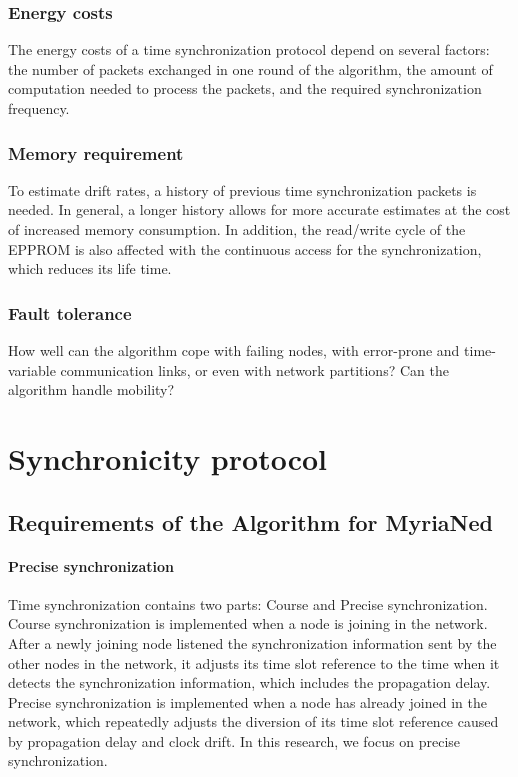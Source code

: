 \documentclass[a4paper,10pt]{report}
\begin{document}
\subsection{\textbf{Energy costs}}
The energy costs of a time synchronization protocol depend on several factors: the number of packets exchanged in one round of the algorithm, the amount of computation needed to process the packets, and the required synchronization frequency.
\subsection{\textbf{Memory requirement}}
To estimate drift rates, a history of previous time synchronization packets is needed. In general, a longer history allows for more accurate estimates at the cost of increased memory consumption. In addition, the read/write cycle of the EPPROM is also affected with the continuous access for the synchronization, which reduces its life time.
\subsection{\textbf{Fault tolerance}}
How well can the algorithm cope with failing nodes, with error-prone and time-variable communication links, or even with network partitions? Can the algorithm handle mobility?
\chapter{\textbf{Synchronicity protocol}}
\section{\textbf{Requirements of the Algorithm for MyriaNed}}
\subsubsection{\textbf{Precise synchronization}}
Time synchronization contains two parts: Course and Precise synchronization. Course synchronization is implemented when a node is joining in the network. After a newly joining node listened the synchronization information sent by the other nodes in the network, it adjusts its time slot reference to the time when it detects the synchronization information, which includes the propagation delay. Precise synchronization is implemented when a node has already joined in the network, which repeatedly adjusts the diversion of its time slot reference caused by propagation delay and clock drift. In this research, we focus on precise synchronization.
\end{document}

